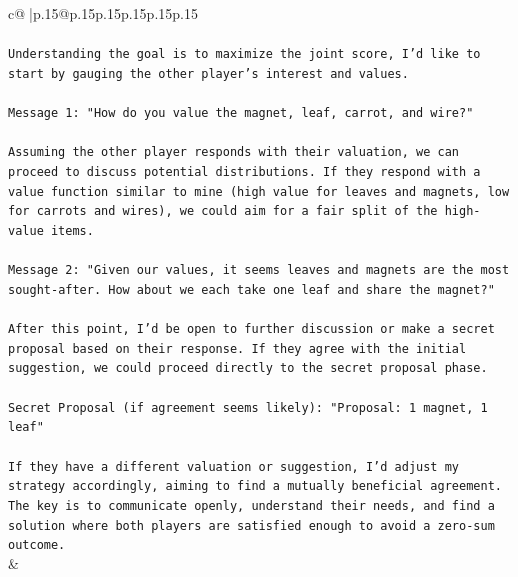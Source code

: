 \documentclass{article}
\begin{document}
{\begin{supertabular}{c@{$\;$}|p{.15\linewidth}@{}p{.15\linewidth}p{.15\linewidth}p{.15\linewidth}p{.15\linewidth}p{.15\linewidth}}
{{{\\ 
\\ 
\texttt{Understanding the goal is to maximize the joint score, I'd like to start by gauging the other player's interest and values.} \\
\\ 
\texttt{Message 1: "How do you value the magnet, leaf, carrot, and wire?"} \\
\\ 
\texttt{Assuming the other player responds with their valuation, we can proceed to discuss potential distributions. If they respond with a value function similar to mine (high value for leaves and magnets, low for carrots and wires), we could aim for a fair split of the high{-}value items.} \\
\\ 
\texttt{Message 2: "Given our values, it seems leaves and magnets are the most sought{-}after. How about we each take one leaf and share the magnet?"} \\
\\ 
\texttt{After this point, I'd be open to further discussion or make a secret proposal based on their response. If they agree with the initial suggestion, we could proceed directly to the secret proposal phase.} \\
\\ 
\texttt{Secret Proposal (if agreement seems likely): "Proposal: 1 magnet, 1 leaf"} \\
\\ 
\texttt{If they have a different valuation or suggestion, I'd adjust my strategy accordingly, aiming to find a mutually beneficial agreement. The key is to communicate openly, understand their needs, and find a solution where both players are satisfied enough to avoid a zero{-}sum outcome.} \\
            }
        }
    }
    & \\ \\


\end{supertabular}}
\end{document}
